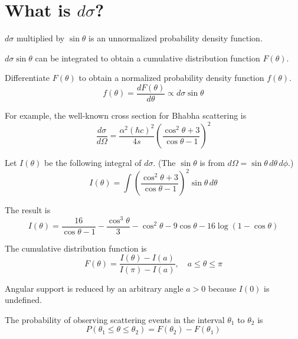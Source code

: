 \documentclass[12pt]{article}
\begin{document}
\section*{What is $d\sigma$?}

$d\sigma$ multiplied by $\sin\theta$ is an unnormalized probability density function.

\bigskip

$d\sigma\sin\theta$ can be integrated to obtain a
cumulative distribution function $F(\theta)$.

\bigskip

Differentiate $F(\theta)$ to obtain a normalized probability density function $f(\theta)$.
\begin{equation*}
f(\theta)=\frac{dF(\theta)}{d\theta}
\propto d\sigma\sin\theta
\end{equation*}

For example, the well-known cross section for Bhabha scattering is
\begin{equation*}
\frac{d\sigma}{d\Omega}
=\frac{\alpha^2(\hbar c)^2}{4s}
\left(\frac{\cos^2\theta+3}{\cos\theta-1}\right)^2
\end{equation*}

Let $I(\theta)$ be the following integral of $d\sigma$.
(The $\sin\theta$ is from $d\Omega=\sin\theta\,d\theta\,d\phi$.)
\begin{equation*}
I(\theta)=\int
\left(
\frac{\cos^2\theta+3}{\cos\theta-1}
\right)^2
\sin\theta\,d\theta
\end{equation*}

The result is
\begin{equation*}
I(\theta)=\frac{16}{\cos\theta-1}-\frac{\cos^3\theta}{3}-\cos^2\theta-9\cos\theta-16\log(1-\cos\theta)
\end{equation*}

The cumulative distribution function is
\begin{equation*}
F(\theta)=\frac{I(\theta)-I(a)}{I(\pi)-I(a)},
\quad
a\le\theta\le\pi
\end{equation*}

Angular support is reduced by an arbitrary angle $a>0$ because $I(0)$ is undefined.

\bigskip

The probability of observing scattering events in the interval $\theta_1$ to $\theta_2$ is
\begin{equation*}
P(\theta_1\le\theta\le\theta_2)=F(\theta_2)-F(\theta_1)
\end{equation*}
\end{document}

